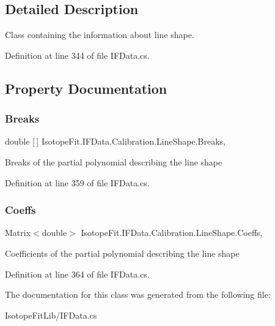 \subsection{Detailed Description}
Class containing the information about line shape. 



Definition at line 344 of file I\+F\+Data.\+cs.



\subsection{Property Documentation}
\mbox{\label{class_isotope_fit_1_1_i_f_data_1_1_calibration_1_1_line_shape_a447511120da7a7c67677aeb723cffd77}} 
\subsubsection{\texorpdfstring{Breaks}{Breaks}}
{\footnotesize\ttfamily double \mbox{[}$\,$\mbox{]} Isotope\+Fit.\+I\+F\+Data.\+Calibration.\+Line\+Shape.\+Breaks\hspace{0.3cm}{\ttfamily [get]}, {\ttfamily [set]}}



Breaks of the partial polynomial describing the line shape 



Definition at line 359 of file I\+F\+Data.\+cs.

\mbox{\label{class_isotope_fit_1_1_i_f_data_1_1_calibration_1_1_line_shape_a8892e37963113bc557f3324a10ff82a0}} 
\subsubsection{\texorpdfstring{Coeffs}{Coeffs}}
{\footnotesize\ttfamily Matrix$<$double$>$ Isotope\+Fit.\+I\+F\+Data.\+Calibration.\+Line\+Shape.\+Coeffs\hspace{0.3cm}{\ttfamily [get]}, {\ttfamily [set]}}



Coefficients of the partial polynomial describing the line shape 



Definition at line 364 of file I\+F\+Data.\+cs.



The documentation for this class was generated from the following file\+:\begin{DoxyCompactItemize}
\item 
Isotope\+Fit\+Lib/I\+F\+Data.\+cs\end{DoxyCompactItemize}
